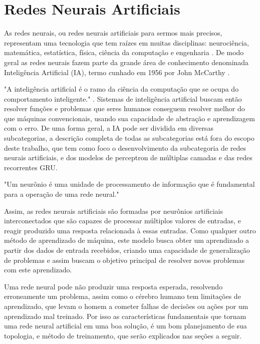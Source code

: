 \section{Redes Neurais Artificiais}

As redes neurais, ou redes neurais artificiais  para sermos mais precisos, representam uma tecnologia que tem raízes em muitas disciplinas: neurociência, matemática, estatística, física, ciência da computação e engenharia \cite{Haykin1994}. 
De modo geral as redes neurais fazem parte da grande área de conhecimento denominada Inteligência Artificial (IA), termo cunhado em 1956 por John McCarthy \cite{kaplan2019siri}.


"A inteligência artificial é o ramo da ciência da computação que se ocupa do comportamento inteligente." \cite{Luger2004}. Sistemas de inteligência artificial buscam então resolver funções e problemas que seres humanos conseguem resolver melhor do que máquinas convencionais, usando sua capacidade de abstração e aprendizagem com o erro. De uma forma geral, a IA pode ser dividida em diversas subcategorias, a descrição completa de todas as subcategorias está fora do escopo deste trabalho, que tem como foco o desenvolvimento da subcategoria de redes neurais artificiais, e dos modelos de perceptron de múltiplas camadas e das redes recorrentes GRU.

"Um neurônio é uma unidade de processamento de informação que é fundamental para a operação de uma rede neural."\cite{Haykin1994} 

Assim, as redes neurais artificiais são formadas por neurônios artificiais interconectados que são capazes de processar múltiplos valores de entradas, e reagir produzido uma resposta relacionada à essas entradas. Como qualquer outro método de aprendizado de máquina, este modelo busca obter um aprendizado a partir dos dados de entrada recebidos, criando uma capacidade de generalização de problemas e assim buscam o objetivo principal de resolver novos problemas com este aprendizado.

Uma rede neural pode não produzir uma resposta esperada, resolvendo erroneamente um problema, assim como o cérebro humano tem limitações de aprendizado, que levam o homem a cometer falhas de decisões ou ações por um aprendizado mal treinado. Por isso as características fundamentais que tornam uma rede neural artificial em uma boa solução, é um bom planejamento de sua topologia, e método de treinamento, que serão explicados nas seções a seguir.

